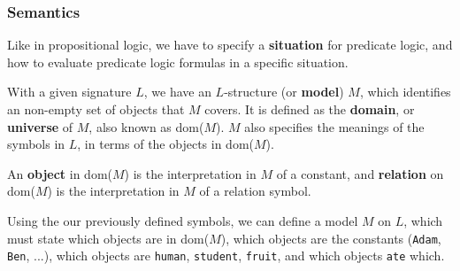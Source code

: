 \documentclass[a4paper, 12pt]{article}
\begin{document}
        \subsubsection*{Semantics}
        Like in propositional logic, we have to specify a \textbf{situation} for predicate logic, and how to evaluate predicate logic formulas in a specific situation.
        \medskip

        With a given signature $L$, we have an $L$-structure (or \textbf{model}) $M$, which identifies an non-empty set of objects that $M$ covers. It is defined as the \textbf{domain}, or \textbf{universe} of $M$, also known as dom($M$). $M$ also specifies the meanings of the symbols in $L$, in terms of the objects in dom($M$).
        \smallskip

        An \textbf{object} in dom($M$) is the interpretation in $M$ of a constant, and \textbf{relation} on dom($M$) is the interpretation in $M$ of a relation symbol.
        \medskip

        Using the our previously defined symbols, we can define a model $M$ on $L$, which must state which objects are in dom($M$), which objects are the constants (\texttt{Adam}, \texttt{Ben}, ...), which objects are \texttt{human}, \texttt{student}, \texttt{fruit}, and which objects \texttt{ate} which.
\end{document}
